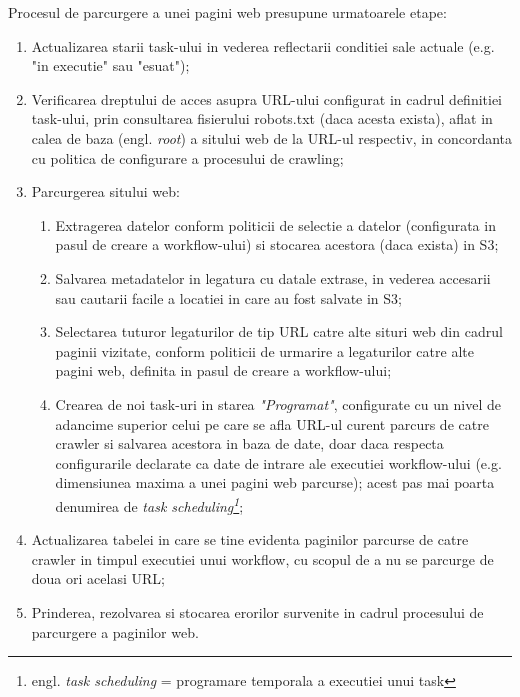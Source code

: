 Procesul de parcurgere a unei pagini web presupune urmatoarele etape:

\begin{enumerate}
	\item{Actualizarea starii task-ului in vederea reflectarii conditiei sale actuale (e.g. "in executie" sau "esuat");}
	
	\item{Verificarea dreptului de acces asupra URL-ului configurat in cadrul definitiei task-ului, prin consultarea fisierului robots.txt (daca acesta exista), aflat in calea de baza (engl. \textit{root}) a sitului web de la URL-ul respectiv, in concordanta cu politica de configurare a procesului de crawling;}
	
	\item{Parcurgerea sitului web:}
	\begin{enumerate}
		\item{Extragerea datelor conform politicii de selectie a datelor (configurata in pasul de creare a workflow-ului) si stocarea acestora (daca exista) in S3;}
		
		\item{Salvarea metadatelor in legatura cu datale extrase, in vederea accesarii sau cautarii facile a locatiei in care au fost salvate in S3;}
		
		\item{Selectarea tuturor legaturilor de tip URL catre alte situri web din cadrul paginii vizitate, conform politicii de urmarire a legaturilor catre alte pagini web, definita in pasul de creare a workflow-ului;}
		
		\item{Crearea de noi task-uri in starea \textit{"Programat"}, configurate cu un nivel de adancime superior celui pe care se afla URL-ul curent parcurs de catre crawler si salvarea acestora in baza de date, doar daca respecta configurarile declarate ca date de intrare ale executiei workflow-ului (e.g. dimensiunea maxima a unei pagini web parcurse); acest pas mai poarta denumirea de \textit{task scheduling\footnote{engl. \textit{task scheduling} = programare temporala a executiei unui task}};}
		
	\end{enumerate}
	
	\item{Actualizarea tabelei in care se tine evidenta paginilor parcurse de catre crawler in timpul executiei unui workflow, cu scopul de a nu se parcurge de doua ori acelasi URL;}
		
	\item{Prinderea, rezolvarea si stocarea erorilor survenite in cadrul procesului de parcurgere a paginilor web.}
	
\end{enumerate}

